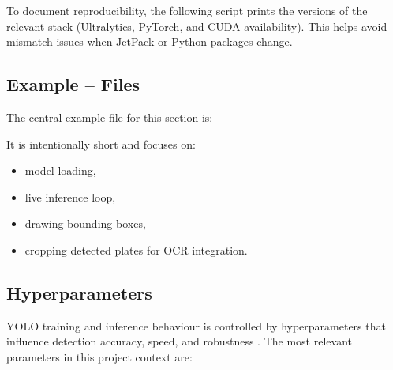 To document reproducibility, the following script prints the versions of the relevant stack (Ultralytics, PyTorch, and CUDA availability). This helps avoid mismatch issues when JetPack or Python packages change.



\subsection{Example -- Files}

The central example file for this section is:

It is intentionally short and focuses on:
\begin{itemize}
	\item model loading,
	\item live inference loop,
	\item drawing bounding boxes,
	\item cropping detected plates for OCR integration.
\end{itemize}



\subsection{Hyperparameters}

YOLO training and inference behaviour is controlled by hyperparameters that influence detection accuracy, speed, and robustness \cite{redmon2016yolo,yaseen2024whatisyolov8}. The most relevant parameters in this project context are:

